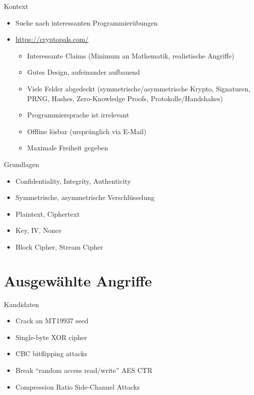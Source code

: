 \documentclass[presentation]{beamer}
\begin{document}
\begin{frame}[label={sec:orgb4ef2cd}]{Kontext}
\begin{itemize}
\item Suche nach interessanten Programmierübungen
\item \url{https://cryptopals.com/}
\begin{itemize}
\item Interessante Claims (Minimum an Mathematik, realistische Angriffe)
\item Gutes Design, aufeinander aufbauend
\item Viele Felder abgedeckt (symmetrische/asymmetrische Krypto,
Signaturen, PRNG, Hashes, Zero-Knowledge Proofs,
Protokolle/Handshakes)
\item Programmiersprache ist irrelevant
\item Offline lösbar (ursprünglich via E-Mail)
\item Maximale Freiheit gegeben
\end{itemize}
\end{itemize}
\end{frame}

\begin{frame}[label={sec:org997598e}]{Grundlagen}
\begin{itemize}
\item Confidentiality, Integrity, Authenticity
\item Symmetrische, asymmetrische Verschlüsselung
\item Plaintext, Ciphertext
\item Key, IV, Nonce
\item Block Cipher, Stream Cipher
\end{itemize}
\end{frame}

\section{Ausgewählte Angriffe}
\label{sec:org6b83c5c}

\begin{frame}[label={sec:org890a129}]{Kandidaten}
\begin{itemize}
\item Crack an MT19937 seed
\item Single-byte XOR cipher
\item CBC bitflipping attacks
\item Break “random access read/write” AES CTR
\item Compression Ratio Side-Channel Attacks
\end{itemize}
\end{frame}
\end{document}
